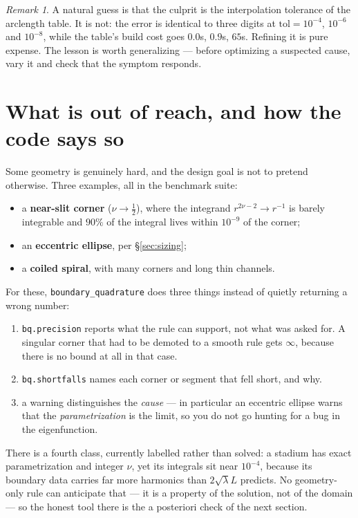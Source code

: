 \documentclass[11pt]{article}
\theoremstyle{definition}
\theoremstyle{remark}
\newtheorem{remark}{Remark}
\newcommand{\code}[1]{\texttt{#1}}
\begin{document}
\begin{remark}
A natural guess is that the culprit is the interpolation tolerance of the
arclength table. It is not: the error is identical to three digits at
$\text{tol}=10^{-4}$, $10^{-6}$ and $10^{-8}$, while the table's build cost goes
$0.0$s, $0.9$s, $65$s. Refining it is pure expense. The lesson is worth
generalizing --- before optimizing a suspected cause, vary it and check that the
symptom responds.
\end{remark}

\section{What is out of reach, and how the code says so}\label{sec:hard}

Some geometry is genuinely hard, and the design goal is not to pretend otherwise.
Three examples, all in the benchmark suite:

\begin{itemize}
\item a \textbf{near-slit corner} ($\nu\to\tfrac12$), where the integrand
      $r^{2\nu-2}\to r^{-1}$ is barely integrable and $90\%$ of the integral
      lives within $10^{-9}$ of the corner;
\item an \textbf{eccentric ellipse}, per \S\ref{sec:sizing};
\item a \textbf{coiled spiral}, with many corners and long thin channels.
\end{itemize}

For these, \code{boundary\_quadrature} does three things instead of quietly
returning a wrong number:
\begin{enumerate}
\item \code{bq.precision} reports what the rule can support, not what was asked
      for. A singular corner that had to be demoted to a smooth rule gets
      $\infty$, because there is no bound at all in that case.
\item \code{bq.shortfalls} names each corner or segment that fell short, and why.
\item a warning distinguishes the \emph{cause} --- in particular an eccentric
      ellipse warns that the \emph{parametrization} is the limit, so you do not
      go hunting for a bug in the eigenfunction.
\end{enumerate}

There is a fourth class, currently labelled rather than solved: a stadium has
exact parametrization and integer $\nu$, yet its integrals sit near
$10^{-4}$, because its boundary data carries far more harmonics than
$2\sqrt\lambda L$ predicts. No geometry-only rule can anticipate that --- it is a
property of the solution, not of the domain --- so the honest tool there is the
a posteriori check of the next section.
\end{document}
